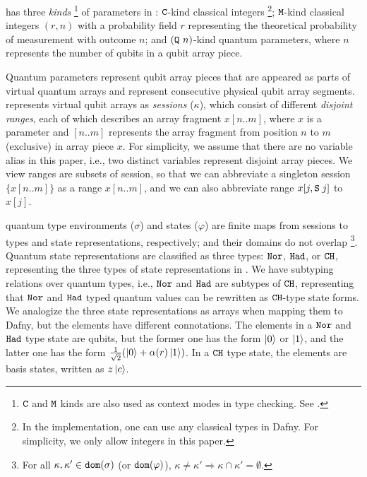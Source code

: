\qafny has three \emph{kinds} \footnote{$\texttt{C}$ and $\texttt{M}$ kinds are also used as context modes in type checking. See . } of parameters in : $\texttt{C}$-kind classical integers \footnote{In the \qafny implementation, one can use any classical types in Dafny. For simplicity, we only allow integers in this paper.}; 
$\texttt{M}$-kind classical integers $(r,n)$ with a probability field $r$ representing the theoretical probability of measurement with outcome $n$; and $(\texttt{Q}~n)$-kind quantum parameters, where $n$ represents the number of qubits in a qubit array piece.

Quantum parameters represent qubit array pieces that are appeared as parts of virtual quantum arrays and represent consecutive physical qubit array segments. \qafny represents virtual qubit arrays as \emph{sessions} ($\kappa$), which consist of different \emph{disjoint ranges}, each of which describes an array fragment $x[n..m]$, where $x$ is a parameter and $[n..m]$ represents the array fragment from position $n$ to $m$ (exclusive) in array piece $x$. For simplicity, we assume that there are no variable alias in this paper, i.e., two distinct variables represent disjoint array pieces. We view ranges are subsets of session, so that we can abbreviate a singleton session $\{x[n..m]\}$ as a range $x[n..m]$, and we can also abbreviate range $x[j,\texttt{S}\;j]$ to $x[j]$.

\qafny quantum type environments ($\sigma$) and states ($\varphi$) are finite maps from sessions to types and state representations, respectively; and their domains do not overlap \footnote{ For all $\kappa, \kappa' \in \mathtt{dom}(\sigma)$ (or $\mathtt{dom}(\varphi)$), $\kappa \neq \kappa' \Rightarrow \kappa \cap \kappa' = \emptyset$.}.
Quantum state representations are classified as three types: $\texttt{Nor}$, $\texttt{Had}$, or $\texttt{CH}$, representing the three types of state representations in . We have subtyping relations over quantum types, i.e., $\texttt{Nor}$ and $\texttt{Had}$ are subtypes of $\texttt{CH}$, representing that $\texttt{Nor}$ and $\texttt{Had}$ typed quantum values can be rewritten as $\texttt{CH}$-type state forms. 
We analogize the three state representations as arrays when mapping them to Dafny, but the elements have different connotations.
The elements in a $\texttt{Nor}$ and $\texttt{Had}$ type state are qubits, but the former one has the form $\left\vert{0}\right\rangle$ or $\left\vert{1}\right\rangle$, and the latter one has the form $\frac{1}{\sqrt{2}}(\left\vert{0}\right\rangle+\alpha(r)\left\vert{1}\right\rangle)$.
In a $\texttt{CH}$ type state, the elements are basis states, written as $z\left\vert{c}\right\rangle$.

